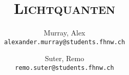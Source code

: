 \author{%
    Murray, Alex\\
    \texttt{alexander.murray@students.fhnw.ch}
    \and
    Suter, Remo\\
    \texttt{remo.suter@students.fhnw.ch}
}

\title{
    \vspace{20mm}
    \Huge{\textsc{Lichtquanten}}
}
